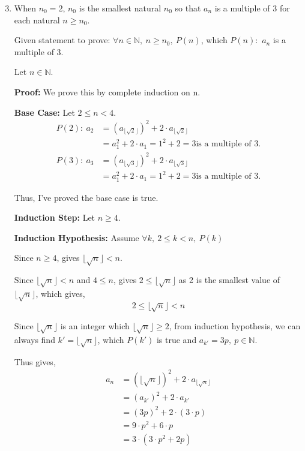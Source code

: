 \documentclass[12pt]{article}
\begin{document}
\begin{enumerate}[label=(\alph*)]
\setcounter{enumi}{2}
    \item When $n_0 = 2$, $n_0$ is the smallest natural $n_0$ so that $a_n$ is a multiple of 3 for each natural $ n \geq n_0$.
    
    Given statement to prove: $\forall n \in \mathbb{N},\ n \geq n_0,\ P(n)$, which $P(n):$ $a_n$ is a multiple of 3.

    Let $n \in \mathbb{N}$.

    \textbf{Proof:} We prove this by complete induction on n.

    \textbf{Base Case:} Let $2 \leq n < 4$.
    \begin{align*}
        P(2):\ a_2 &= (a_{\lfloor \sqrt{2} \rfloor})^2 + 2 \cdot a_{\lfloor \sqrt{2} \rfloor} \\
        &= a_1^2 + 2 \cdot a_1 = 1^2 + 2 = 3 \text{is a multiple of 3}.
    \end{align*}
    \begin{align*}
        P(3):\ a_3 &= (a_{\lfloor \sqrt{3} \rfloor})^2 + 2 \cdot a_{\lfloor \sqrt{3} \rfloor} \\
        &= a_1^2 + 2 \cdot a_1 = 1^2 + 2 = 3 \text{is a multiple of 3}.
    \end{align*}

    Thus, I've proved the base case is true.

    \textbf{Induction Step:} Let $n \geq 4$.

    \textbf{Induction Hypothesis:} Assume $\forall k,\ 2\leq k < n,\ P(k)$

    Since $n \geq 4$, gives $\lfloor \sqrt{n} \rfloor < n$.

    Since $\lfloor \sqrt{n} \rfloor < n$ and $4 \leq n$, gives $2 \leq \lfloor \sqrt{n} \rfloor$ as 2 is the smallest value of $\lfloor \sqrt{n} \rfloor$, which gives, $$2 \leq \lfloor \sqrt{n} \rfloor < n $$

    Since $\lfloor \sqrt{n} \rfloor$ is an integer which $\lfloor \sqrt{n} \rfloor \geq 2$, from induction hypothesis, we can always find $k' = \lfloor \sqrt{n} \rfloor$, which $P(k')$ is true and $a_{k'} = 3p,\ p \in \mathbb{N}$.

    Thus gives,
    \begin{align*}
        a_n &= (\lfloor \sqrt{n} \rfloor)^2 + 2\cdot a_{\lfloor \sqrt{n} \rfloor} \\
        &= (a_{k'})^2 + 2\cdot a_{k'} \\
        &= (3p)^2 + 2 \cdot (3 \cdot p) \\
        &= 9 \cdot p^2 + 6 \cdot p \\
        &= 3 \cdot (3\cdot p^2 + 2p)
    \end{align*}


\end{enumerate}
\end{document}
